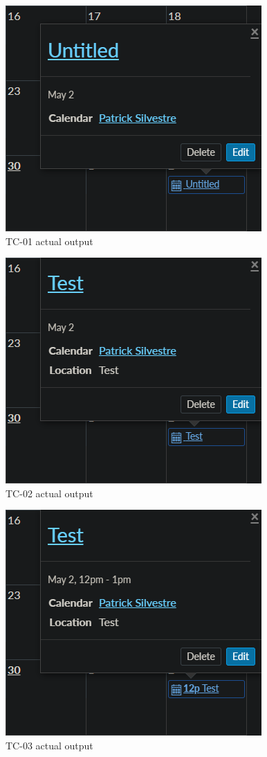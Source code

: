 \documentclass[10pt,letterpaper]{article}
\begin{document}
\begin{figure}[!htb]
	\centerline{\includegraphics[]{screenshots/tc01-actual-output.png}}
	\caption{TC-01 actual output}
\end{figure}
\begin{figure}[!htb]
	\centerline{\includegraphics[]{screenshots/tc02-actual-output.png}}
	\caption{TC-02 actual output}
\end{figure}
\pagebreak
\begin{figure}[!htb]
	\centerline{\includegraphics[]{screenshots/tc03-actual-output.png}}
	\caption{TC-03 actual output}
\end{figure}
\end{document}
